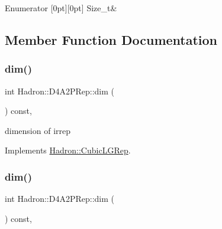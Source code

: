 \begin{DoxyEnumFields}{Enumerator}
[0pt][0pt]{}\mbox{\label{structHadron_1_1D4A2PRep_aa11309c2c210a17be4386a7dd7d66095af640bb2b47620daafc46e1bc50bc2104}} 
Size\+\_\+t&\\
\hline

\end{DoxyEnumFields}


\subsection{Member Function Documentation}
\mbox{\label{structHadron_1_1D4A2PRep_ace9d2d2d6b73e3ec4de7682a8930ff1c}} 
\subsubsection{\texorpdfstring{dim()}{dim()}\hspace{0.1cm}{\footnotesize\ttfamily [1/3]}}
{\footnotesize\ttfamily int Hadron\+::\+D4\+A2\+P\+Rep\+::dim (\begin{DoxyParamCaption}{ }\end{DoxyParamCaption}) const\hspace{0.3cm}{\ttfamily [inline]}, {\ttfamily [virtual]}}

dimension of irrep 

Implements \mbox{\hyperlink{structHadron_1_1CubicLGRep_a3acbaea26503ed64f20df693a48e4cdd}{Hadron\+::\+Cubic\+L\+G\+Rep}}.

\mbox{\label{structHadron_1_1D4A2PRep_ace9d2d2d6b73e3ec4de7682a8930ff1c}} 
\subsubsection{\texorpdfstring{dim()}{dim()}\hspace{0.1cm}{\footnotesize\ttfamily [2/3]}}
{\footnotesize\ttfamily int Hadron\+::\+D4\+A2\+P\+Rep\+::dim (\begin{DoxyParamCaption}{ }\end{DoxyParamCaption}) const\hspace{0.3cm}{\ttfamily [inline]}, {\ttfamily [virtual]}}

